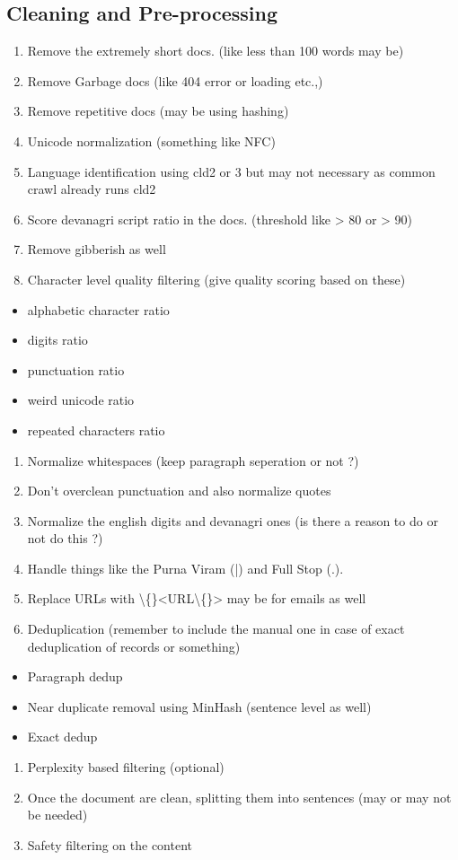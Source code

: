 \documentclass[10pt,a4paper]{article}
\begin{document}
\subsection{Cleaning and Pre-processing}
\begin{enumerate}
\item Remove the extremely short docs. (like less than 100 words may be)
\item Remove Garbage docs (like 404 error or loading etc.,)
\item Remove repetitive docs (may be using hashing)
\item Unicode normalization (something like NFC)
\item Language identification using cld2 or 3 but may not necessary as common crawl already runs cld2
\item Score devanagri script ratio in the docs. (threshold like > 80 or > 90)
\item Remove gibberish as well
\item Character level quality filtering (give quality scoring based on these)
\end{enumerate}
\begin{itemize}
\item alphabetic character ratio
\item digits ratio
\item punctuation ratio
\item weird unicode ratio
\item repeated characters ratio
\end{itemize}
\begin{enumerate}
\item Normalize whitespaces (keep paragraph seperation or not ?)
\item Don't overclean punctuation and also normalize quotes
\item Normalize the english digits and devanagri ones (is there a reason to do or not do this ?)
\item Handle things like the Purna Viram (|) and Full Stop (.).
\item Replace URLs with \textbackslash\{\}<URL\textbackslash\{\}> may be for emails as well
\item Deduplication (remember to include the manual one in case of exact deduplication of records or something)
\end{enumerate}
\begin{itemize}
\item Paragraph dedup
\item Near duplicate removal using MinHash (sentence level as well)
\item Exact dedup
\end{itemize}
\begin{enumerate}
\item Perplexity based filtering (optional)
\item Once the document are clean, splitting them into sentences (may or may not be needed)
\item Safety filtering on the content
\end{enumerate}
\end{document}
